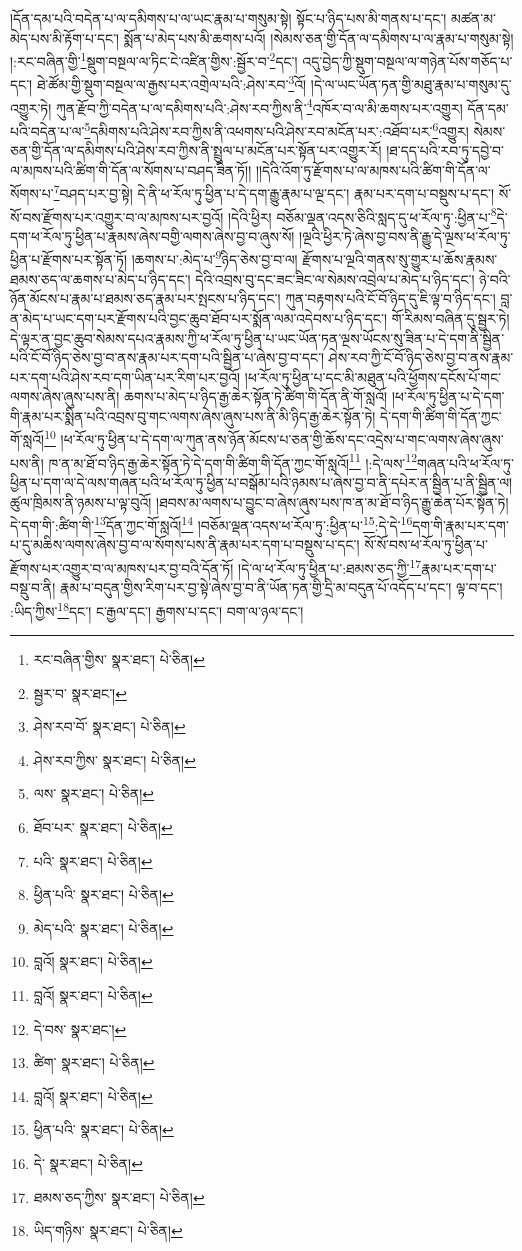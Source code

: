 །དོན་དམ་པའི་བདེན་པ་ལ་དམིགས་པ་ལ་ཡང་རྣམ་པ་གསུམ་སྟེ། སྟོང་པ་ཉིད་པས་མི་གནས་པ་དང་། མཚན་མ་མེད་པས་མི་རྟོག་པ་དང་། སྨོན་པ་མེད་པས་མི་ཆགས་པའོ། །སེམས་ཅན་གྱི་དོན་ལ་དམིགས་པ་ལ་རྣམ་པ་གསུམ་སྟེ། །:རང་བཞིན་གྱི་\footnote{རང་བཞིན་གྱིས་  སྣར་ཐང་།  པེ་ཅིན། }སྡུག་བསྔལ་ལ་ཏིང་ངེ་འཛིན་གྱིས་:སྦྱོར་བ་\footnote{སྦྱར་བ་  སྣར་ཐང་། }དང་། འདུ་བྱེད་ཀྱི་སྡུག་བསྔལ་ལ་གཉེན་པོས་གཅོད་པ་དང་། ཐེ་ཚོམ་གྱི་སྡུག་བསྔལ་ལ་རྒྱས་པར་འགྲེལ་པའི་:ཤེས་རབ་\footnote{ཤེས་རབ་བོ་  སྣར་ཐང་།  པེ་ཅིན། }འོ། །དེ་ལ་ཡང་ཡོན་ཏན་གྱི་མཐུ་རྣམ་པ་གསུམ་དུ་འགྱུར་ཏེ། ཀུན་རྫོབ་ཀྱི་བདེན་པ་ལ་དམིགས་པའི་:ཤེས་རབ་ཀྱིས་ནི་\footnote{ཤེས་རབ་ཀྱིས་  སྣར་ཐང་།  པེ་ཅིན། }འཁོར་བ་ལ་མི་ཆགས་པར་འགྱུར། དོན་དམ་པའི་བདེན་པ་ལ་\footnote{ལས་  སྣར་ཐང་།  པེ་ཅིན། }དམིགས་པའི་ཤེས་རབ་ཀྱིས་ནི་འཕགས་པའི་ཤེས་རབ་མངོན་པར་:འཐོབ་པར་\footnote{ཐོབ་པར་  སྣར་ཐང་།  པེ་ཅིན། }འགྱུར། སེམས་ཅན་གྱི་དོན་ལ་དམིགས་པའི་ཤེས་རབ་ཀྱིས་ནི་སྤྲུལ་པ་མངོན་པར་སྟོན་པར་འགྱུར་རོ། །ཐ་དད་པའི་རབ་ཏུ་དབྱེ་བ་ལ་མཁས་པའི་ཚིག་གི་དོན་ལ་སོགས་པ་བཤད་ཟིན་ཏོ།། །།དེའི་འོག་ཏུ་རྫོགས་པ་ལ་མཁས་པའི་ཚིག་གི་དོན་ལ་སོགས་པ་\footnote{པའི་  སྣར་ཐང་།  པེ་ཅིན། }བཤད་པར་བྱ་སྟེ། དེ་ནི་ཕ་རོལ་ཏུ་ཕྱིན་པ་དེ་དག་རྒྱུ་རྣམ་པ་ལྔ་དང་། རྣམ་པར་དག་པ་བསྡུས་པ་དང་། སོ་སོ་བས་རྫོགས་པར་འགྱུར་བ་ལ་མཁས་པར་བྱའོ། །དེའི་ཕྱིར། བཅོམ་ལྡན་འདས་ཅིའི་སླད་དུ་ཕ་རོལ་ཏུ་:ཕྱིན་པ་\footnote{ཕྱིན་པའི་  སྣར་ཐང་།  པེ་ཅིན། }དེ་དག་ཕ་རོལ་ཏུ་ཕྱིན་པ་རྣམས་ཞེས་བགྱི་ལགས་ཞེས་བྱ་བ་ཞུས་སོ། །ལྔའི་ཕྱིར་ཏེ་ཞེས་བྱ་བས་ནི་རྒྱུ་དེ་ལྔས་ཕ་རོལ་ཏུ་ཕྱིན་པ་རྫོགས་པར་སྟོན་ཏོ། །ཆགས་པ་:མེད་པ་\footnote{མེད་པའི་  སྣར་ཐང་།  པེ་ཅིན། }ཉིད་ཅེས་བྱ་བ་ལ། རྫོགས་པ་ལྔའི་གནས་སུ་གྱུར་པ་ཆོས་རྣམས་ཐམས་ཅད་ལ་ཆགས་པ་མེད་པ་ཉིད་དང་། དེའི་འབྲས་བུ་དང་ཟང་ཟིང་ལ་སེམས་འབྲེལ་པ་མེད་པ་ཉིད་དང་། ཉེ་བའི་ཉོན་མོངས་པ་རྣམ་པ་ཐམས་ཅད་རྣམ་པར་སྤངས་པ་ཉིད་དང་། ཀུན་བརྟགས་པའི་ངོ་བོ་ཉིད་དུ་ཇི་ལྟ་བ་ཉིད་དང་། བླ་ན་མེད་པ་ཡང་དག་པར་རྫོགས་པའི་བྱང་ཆུབ་ཐོབ་པར་སྨོན་ལམ་འདེབས་པ་ཉིད་དང་། གོ་རིམས་བཞིན་དུ་སྦྱར་ཏེ། དེ་ལྟར་ན་བྱང་ཆུབ་སེམས་དཔའ་རྣམས་ཀྱི་ཕ་རོལ་ཏུ་ཕྱིན་པ་ཡང་ཡོན་ཏན་ལྔས་ཡོངས་སུ་ཟིན་པ་དེ་དག་ནི་སྦྱིན་པའི་ངོ་བོ་ཉིད་ཅེས་བྱ་བ་ནས་རྣམ་པར་དག་པའི་སྦྱིན་པ་ཞེས་བྱ་བ་དང་། ཤེས་རབ་ཀྱི་ངོ་བོ་ཉིད་ཅེས་བྱ་བ་ནས་རྣམ་པར་དག་པའི་ཤེས་རབ་དག་ཡིན་པར་རིག་པར་བྱའོ། །ཕ་རོལ་ཏུ་ཕྱིན་པ་དང་མི་མཐུན་པའི་ཕྱོགས་དངོས་པོ་གང་ལགས་ཞེས་ཞུས་པས་ནི། ཆགས་པ་མེད་པ་ཉིད་རྒྱ་ཆེར་སྟོན་ཏེ་ཚིག་གི་དོན་ནི་གོ་སླའོ། །ཕ་རོལ་ཏུ་ཕྱིན་པ་དེ་དག་གི་རྣམ་པར་སྨིན་པའི་འབྲས་བུ་གང་ལགས་ཞེས་ཞུས་པས་ནི་མི་ཉིད་རྒྱ་ཆེར་སྟོན་ཏེ། དེ་དག་གི་ཚིག་གི་དོན་ཀྱང་གོ་སླའོ།\footnote{བླའོ།  སྣར་ཐང་།  པེ་ཅིན། } །ཕ་རོལ་ཏུ་ཕྱིན་པ་དེ་དག་ལ་ཀུན་ནས་ཉོན་མོངས་པ་ཅན་གྱི་ཆོས་དང་འདྲེས་པ་གང་ལགས་ཞེས་ཞུས་པས་ནི། ཁ་ན་མ་ཐོ་བ་ཉིད་རྒྱ་ཆེར་སྟོན་ཏེ་དེ་དག་གི་ཚིག་གི་དོན་ཀྱང་གོ་སླའོ།\footnote{བླའོ།  སྣར་ཐང་།  པེ་ཅིན། } །:དེ་ལས་\footnote{དེ་བས་  སྣར་ཐང་། }གཞན་པའི་ཕ་རོལ་ཏུ་ཕྱིན་པ་དག་ལ་དེ་ལས་གཞན་པའི་ཕ་རོལ་ཏུ་ཕྱིན་པ་བསྒོམ་པའི་ཉམས་པ་ཞེས་བྱ་བ་ནི་དཔེར་ན་སྦྱིན་པ་ནི་སྦྱིན་ལ། ཚུལ་ཁྲིམས་ནི་ཉམས་པ་ལྟ་བུའོ། །ཐབས་མ་ལགས་པ་བྱུང་བ་ཞེས་ཞུས་པས་ཁ་ན་མ་ཐོ་བ་ཉིད་རྒྱུ་ཆེན་པོར་སྟོན་ཏེ། དེ་དག་གི་:ཚིག་གི་\footnote{ཚིག་  སྣར་ཐང་།  པེ་ཅིན། }དོན་ཀྱང་གོ་སླའོ།\footnote{བླའོ།  སྣར་ཐང་།  པེ་ཅིན། } །བཅོམ་ལྡན་འདས་ཕ་རོལ་ཏུ་:ཕྱིན་པ་\footnote{ཕྱིན་པའི་  སྣར་ཐང་།  པེ་ཅིན། }:དེ་དེ་\footnote{དེ་  སྣར་ཐང་།  པེ་ཅིན། }དག་གི་རྣམ་པར་དག་པ་དུ་མཆིས་ལགས་ཞེས་བྱ་བ་ལ་སོགས་པས་ནི་རྣམ་པར་དག་པ་བསྡུས་པ་དང་། སོ་སོ་བས་ཕ་རོལ་ཏུ་ཕྱིན་པ་རྫོགས་པར་འགྱུར་བ་ལ་མཁས་པར་བྱ་བའི་དོན་ཏོ། །དེ་ལ་ཕ་རོལ་ཏུ་ཕྱིན་པ་:ཐམས་ཅད་ཀྱི་\footnote{ཐམས་ཅད་ཀྱིས་  སྣར་ཐང་།  པེ་ཅིན། }རྣམ་པར་དག་པ་བསྡུ་བ་ནི། རྣམ་པ་བདུན་གྱིས་རིག་པར་བྱ་སྟེ་ཞེས་བྱ་བ་ནི་ཡོན་ཏན་གྱི་དྲི་མ་བདུན་པོ་འདོད་པ་དང་། ལྟ་བ་དང་། :ཡིད་ཀྱིས་\footnote{ཡིད་གཉིས་  སྣར་ཐང་།  པེ་ཅིན། }དང་། ང་རྒྱལ་དང་། རྒྱགས་པ་དང་། བག་ལ་ཉལ་དང་། 